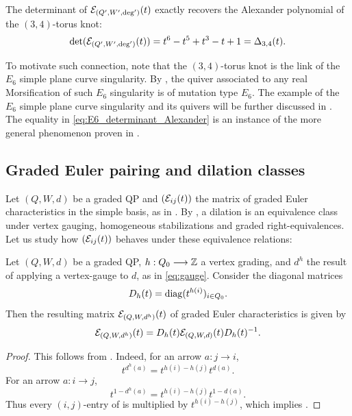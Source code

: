 \noindent The determinant of $\mathcal E_{(Q',W',\deg')}(t)$ exactly recovers the Alexander polynomial of the $(3,4)$-torus knot:
\begin{equation}\label{eq:E6_determinant_Alexander}
\det(\mathcal E_{(Q',W',\deg')}(t)) = t^{6} - t^{5} + t^{3} - t + 1 = \Delta_{3,4}(t).
\end{equation}

\noindent To motivate such connection, note that the $(3,4)$-torus knot is the link of the $E_6$ simple plane curve singularity. By \cite[Theorem 18.3]{FPST}, the quiver associated to any real Morsification of such $E_6$ singularity is of mutation type $E_6$. The example of the $E_6$ simple plane curve singularity and its quivers will be further discussed in . The equality in \eqref{eq:E6_determinant_Alexander} is an instance of the more general phenomenon proven in .

\subsection{Graded Euler pairing and dilation classes}\label{sec:euler-dilation} Let $(Q,W,d)$ be a graded QP and $(\mathcal E_{ij}(t))$ the matrix of graded Euler characteristics in the simple basis, as in . By , a dilation is an equivalence class under vertex gauging, homogeneous stabilizations and graded right-equivalences. Let us study how $(\mathcal E_{ij}(t))$ behaves under these equivalence relations:

\begin{lemma}\label{prop:euler-gauge}
Let $(Q,W,d)$ be a graded QP, $h:Q_0\longrightarrow\mathbb Z$ a vertex grading, and \(d^h\) the result of applying a vertex-gauge to $d$, as in \eqref{eq:gauge}. Consider the diagonal matrices
\[
 D_h(t)=\operatorname{diag}(t^{h(i)})_{i\in Q_0}.
\]
Then the resulting matrix $\mathcal E_{(Q,W,d^h)}(t)$ of graded Euler characteristics is given by
\begin{equation}\label{eq:euler-gauge}
 \mathcal E_{(Q,W,d^h)}(t)
 =D_h(t)\mathcal E_{(Q,W,d)}(t)D_h(t)^{-1}.
\end{equation}
\end{lemma}

\begin{proof}
This follows from . Indeed, for an arrow \(a:j\to i\),
\[
 t^{d^h(a)}=t^{h(i)-h(j)}t^{d(a)}.
\]
For an arrow \(a:i\to j\),
\[
 t^{1-d^h(a)}=t^{h(i)-h(j)}t^{1-d(a)}.
\]
Thus every \((i,j)\)-entry of  is multiplied by
\(t^{h(i)-h(j)}\), which implies
.
\end{proof}

